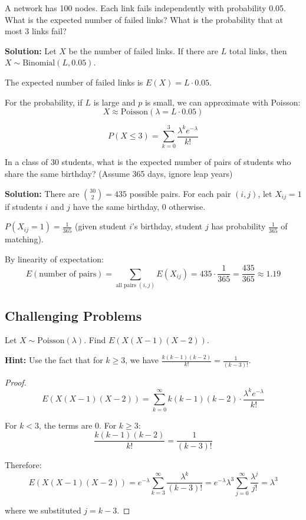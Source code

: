 \begin{eg}
A network has 100 nodes. Each link fails independently with probability 0.05. What is the expected number of failed links? What is the probability that at most 3 links fail?

\textbf{Solution:}
Let \(X\) be the number of failed links. If there are \(L\) total links, then \(X \sim \text{Binomial}(L, 0.05)\).

The expected number of failed links is \(E(X) = L \cdot 0.05\).

For the probability, if \(L\) is large and \(p\) is small, we can approximate with Poisson:
\[
X \approx \text{Poisson}(\lambda = L \cdot 0.05)
\]

\[
P(X \leq 3) = \sum_{k=0}^{3} \frac{\lambda^k e^{-\lambda}}{k!}
\]
\end{eg}

\begin{eg}
In a class of 30 students, what is the expected number of pairs of students who share the same birthday? (Assume 365 days, ignore leap years)

\textbf{Solution:}
There are \(\binom{30}{2} = 435\) possible pairs. For each pair \((i,j)\), let \(X_{ij} = 1\) if students \(i\) and \(j\) have the same birthday, \(0\) otherwise.

\(P(X_{ij} = 1) = \frac{1}{365}\) (given student \(i\)'s birthday, student \(j\) has probability \(\frac{1}{365}\) of matching).

By linearity of expectation:
\[
E(\text{number of pairs}) = \sum_{\text{all pairs } (i,j)} E(X_{ij}) = 435 \cdot \frac{1}{365} = \frac{435}{365} \approx 1.19
\]
\end{eg}

\subsection{Challenging Problems}

\begin{exercise}
Let \(X \sim \text{Poisson}(\lambda)\). Find \(E(X(X-1)(X-2))\).

\textbf{Hint:} Use the fact that for \(k \geq 3\), we have \(\frac{k(k-1)(k-2)}{k!} = \frac{1}{(k-3)!}\).
\end{exercise}

\begin{proof}
\[
E(X(X-1)(X-2)) = \sum_{k=0}^{\infty} k(k-1)(k-2) \cdot \frac{\lambda^k e^{-\lambda}}{k!}
\]

For \(k < 3\), the terms are 0. For \(k \geq 3\):
\[
\frac{k(k-1)(k-2)}{k!} = \frac{1}{(k-3)!}
\]

Therefore:
\[
E(X(X-1)(X-2)) = e^{-\lambda} \sum_{k=3}^{\infty} \frac{\lambda^k}{(k-3)!} = e^{-\lambda} \lambda^3 \sum_{j=0}^{\infty} \frac{\lambda^j}{j!} = \lambda^3
\]

where we substituted \(j = k-3\).
\end{proof}

